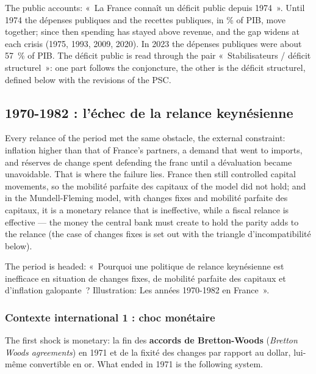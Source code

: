 The public accounts: «~La France connaît un déficit public depuis 1974~». Until 1974
the dépenses publiques and the recettes publiques, in \% of PIB, move together; since
then spending has stayed above revenue, and the gap widens at each crisis (1975, 1993,
2009, 2020). In 2023 the dépenses publiques were about 57~\% of PIB. The déficit public is read
through the pair «~Stabilisateurs / déficit structurel~»: one part follows the
conjoncture, the other is the déficit structurel, defined below with the revisions of
the PSC.

\subsection{1970-1982 : l'échec de la relance keynésienne}

Every relance of the period met the same obstacle, the external constraint: inflation
higher than that of France's partners, a demand that went to imports, and réserves de
change spent defending the franc until a dévaluation became unavoidable. That is where
the failure lies. France then still controlled
capital movements, so the mobilité parfaite des capitaux of the model did not hold; and
in the Mundell-Fleming model, with changes fixes and mobilité parfaite des capitaux, it
is a monetary relance that is ineffective, while a fiscal relance is effective --- the
money the central bank must create to hold the parity adds to the relance (the case
of changes fixes is set out with the triangle d'incompatibilité below).

\begin{remark}
  The period is headed: «~Pourquoi une politique de relance keynésienne est inefficace
  en situation de changes fixes, de mobilité parfaite des capitaux et d'inflation
  galopante~? Illustration: Les années 1970-1982 en France~».
\end{remark}

\subsubsection{Contexte international 1 : choc monétaire}

The first shock is monetary: la fin des \textbf{accords de Bretton-Woods}
(\textit{Bretton Woods agreements}) en 1971 et de la fixité des changes par rapport au
dollar, lui-même convertible en or. What ended in 1971 is the following system.


